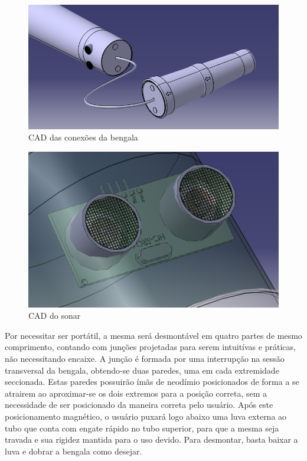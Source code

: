 \begin{figure}[H]
\includegraphics[scale=0.5]{figuras/bengala/conexaobengalacorreto.PNG}
\centering
\caption{CAD das conexões da bengala}
\label{fig:sensor.jpg}
\end{figure}

\begin{figure}[H]
\includegraphics[scale=0.5]{figuras/bengala/senssorultrassonico2.PNG}
\centering
\caption{CAD do sonar}
\label{fig:sensor.jpg}
\end{figure}


Por necessitar ser portátil, a mesma será desmontável em quatro partes de mesmo comprimento, contando com junções projetadas para serem intuitívas e práticas, não necessitando encaixe. A junção é formada por uma interrupção na sessão transversal da bengala, obtendo-se duas paredes, uma em cada extremidade seccionada. Estas paredes possuirão ímãs de neodímio posicionados de forma a se atrairem ao aproximar-se os dois extremos para a posição correta, sem a necessidade de ser posicionado da maneira correta pelo usuário. Após este posicionamento magnético, o usuário puxará logo abaixo uma luva externa ao tubo que conta com engate rápido no tubo superior, para que a mesma seja travada e sua rigidez mantida para o uso devido. Para desmontar, basta baixar a luva e dobrar a bengala como desejar.

